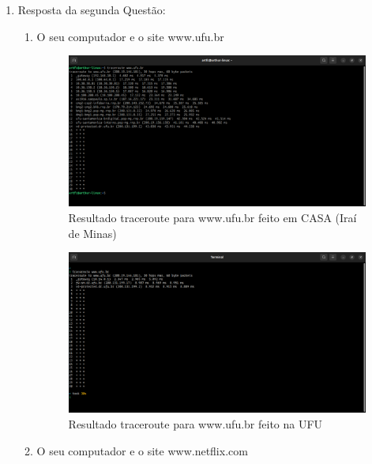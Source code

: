 \documentclass[12pt,a4paper]{report}
\begin{document}
	\begin{enumerate}
		\item Resposta da segunda Questão:
		\begin{enumerate}[label=(\alph*)]
			\item O seu computador e o site www.ufu.br
			
			\begin{figure}[H]
				\centering
				\includegraphics[width=\textwidth, keepaspectratio]{tracerouteufu.png}
				\caption{Resultado traceroute para www.ufu.br feito em CASA (Iraí de Minas)}
				\label{fig:tracerouteUFU}
			\end{figure}

			\begin{figure}[H]
				\centering
				\includegraphics[width=\textwidth, keepaspectratio]{tracerouteufuufu.png}
				\caption{Resultado traceroute para www.ufu.br feito na  UFU}
				\label{fig:tracerouteUFU_UFU}
			\end{figure}

			\item O seu computador e o site www.netflix.com
			

\end{enumerate}
\end{enumerate}
\end{document}
